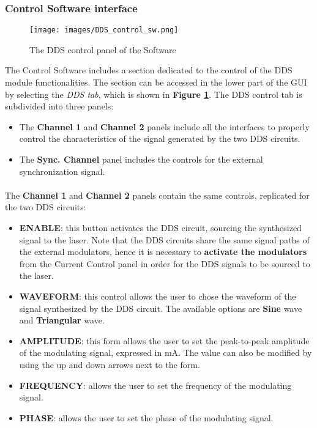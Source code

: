 
\subsubsection{Control Software interface}
\begin{figure}
    \centering
    \texttt{[image: images/DDS\_control\_sw.png]}
    \caption{The DDS control panel of the  \SoftwareType Software}
    \label{DDS_control_panel}
\end{figure}
The \QubeModel  \textunderscore Control Software includes a section dedicated to the control of the DDS module functionalities. The section can be accessed in the lower part of the GUI by selecting the \textit{DDS tab}, which is shown in \textbf{Figure \ref{DDS_control_panel}}.
\newline The DDS control tab is subdivided into three panels:
\begin{itemize}
    \item The \textbf{Channel 1} and \textbf{Channel 2} panels include all the interfaces to properly control the characteristics of the signal generated by the two DDS circuits.
    \item The \textbf{Sync. Channel} panel includes the controls for the external synchronization signal.
\end{itemize}

\paragraph{} The \textbf{Channel 1} and \textbf{Channel 2} panels contain the same controls, replicated for the two DDS circuits:
\begin{itemize}
    \item \textbf{ENABLE}: this button activates the DDS circuit, sourcing the synthesized signal to the laser. Note that the DDS circuits share the same signal paths of the external modulators, hence it is necessary to \textbf{activate the modulators} from the Current Control panel in order for the DDS signals to be sourced to the laser.
    
    \item \textbf{WAVEFORM}: this control allows the user to chose the waveform of the signal synthesized by the DDS circuit. The available options are \textbf{Sine} wave and \textbf{Triangular} wave.
    
    \item \textbf{AMPLITUDE}: this form allows the user to set the peak-to-peak amplitude of the modulating signal, expressed in mA. The value can also be modified by using the up and down arrows next to the form.
    
    \item \textbf{FREQUENCY}: allows the user to set the frequency of the modulating signal.
    
    \item \textbf{PHASE}: allows the user to set the phase of the modulating signal.
\end{itemize}

